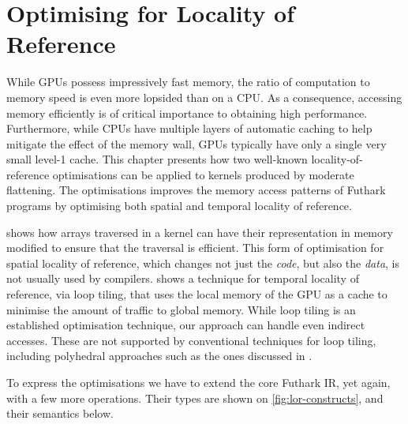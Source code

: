 \chapter{Optimising for Locality of Reference}
\label{chap:tiling}

While GPUs possess impressively fast memory, the ratio of computation
to memory speed is even more lopsided than on a CPU.  As a
consequence, accessing memory efficiently is of critical importance to
obtaining high performance.  Furthermore, while CPUs have multiple
layers of automatic caching to help mitigate the effect of the memory
wall, GPUs typically have only a single very small level-1 cache.
This chapter presents how two well-known locality-of-reference
optimisations can be applied to kernels produced by moderate
flattening.  The optimisations improves the memory access patterns of
Futhark programs by optimising both spatial and temporal locality of
reference.

 shows how arrays traversed in a kernel
can have their representation in memory modified to ensure that the
traversal is efficient.  This form of optimisation for spatial
locality of reference, which changes not just the \textit{code}, but
also the \textit{data}, is not usually used by compilers.
 shows a technique for temporal locality of
reference, via loop tiling, that uses the local memory of the GPU as a
cache to minimise the amount of traffic to global memory.  While loop
tiling is an established optimisation technique, our approach can
handle even indirect accesses.  These are not supported by
conventional techniques for loop tiling, including polyhedral
approaches such as the ones discussed in
\cite{chatarasi2015polyhedral}.

To express the optimisations we have to extend the core Futhark IR,
yet again, with a few more operations.  Their types are shown on
\cref{fig:lor-constructs}, and their semantics below.

